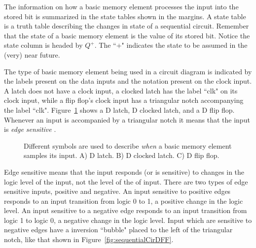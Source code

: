 The information on how a basic memory element processes the input into 
the stored bit is summarized in the state tables shown in the margins.
A state table is a truth table describing the changes in state 
of a sequential  circuit.  Remember that the state of a basic memory 
element is the value of its stored bit.  Notice the state column 
is headed by $Q^+$. The ``$+$" indicates the state to be assumed
in the (very) near future.

The type of basic memory element being used in a 
circuit diagram is indicated by the labels present on the data inputs and the 
notation present on the clock input.  A latch does not have a clock
input, a clocked latch has the label ``clk" on its clock input,
while a flip flop's clock input has a triangular notch accompanying 
the label ``clk".  Figure~\ref{fig:sequentialCirdevices} shows a D latch, 
D clocked latch, and a D flip flop.  Whenever an input is accompanied
by a triangular notch it means that the input is \textit{ edge sensitive}
.  

\begin{figure}[ht]
\caption{Different symbols are used to describe \textit{ when} a basic
memory element samples its input.  A) D latch. B) D clocked latch.  
C) D flip flop.}
\label{fig:sequentialCirdevices}
\end{figure}

Edge sensitive means that the input responds (or is sensitive)
to changes in the logic level of the input, not the level of the 
of input.  There are two types of edge sensitive inputs, positive
and negative.  An input sensitive to positive edges responds to an
input  transition from logic 0 to 1, a positive change in the logic 
level.  An input sensitive to a negative edge responds to an input
transition from logic 1 to logic 0, a negative change in the logic 
level.  Input which are sensitive to negative edges have a inversion
``bubble" placed to the left of the triangular notch, like that shown
in Figure~\ref{fig:sequentialCirDFF}.

